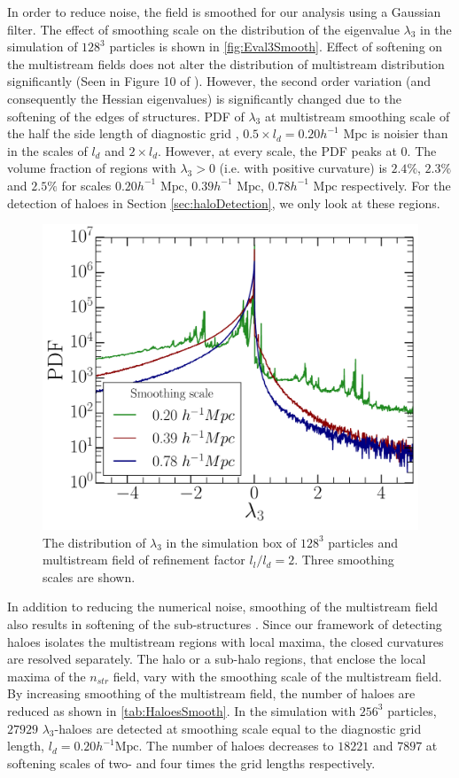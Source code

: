 \documentclass[fleqn,usenatbib,useAMS]{mnras}
\begin{document}
{In order to reduce noise, the field is smoothed for our analysis using a Gaussian filter. The effect of smoothing scale on the distribution of the eigenvalue $\lambda_3$ in the simulation of $128^3$ particles is shown in \autoref{fig:Eval3Smooth}. Effect of softening on the multistream fields does not alter the distribution of multistream distribution significantly (Seen in Figure 10 of \citealt{Ramachandra2017}).
However, the second order variation (and consequently the Hessian eigenvalues) is significantly changed due to the softening of the edges of structures. PDF of $\lambda_3$ at multistream smoothing scale of the half the side length of diagnostic grid , $0.5 \times l_d = 0.20 h^{-1} \text{ Mpc}$ is noisier than in the scales of $l_d$ and $2 \times l_d$. However, at every scale, the PDF peaks at $0$. The volume fraction of regions with $\lambda_3 > 0$ (i.e. with positive curvature) is $2.4\%$, $2.3\%$ and $2.5\%$ for scales $0.20 h^{-1} \text{ Mpc}$, $0.39 h^{-1} \text{ Mpc}$, $0.78 h^{-1} \text{ Mpc}$ respectively. For the detection of haloes in Section \ref{sec:haloDetection}, we only look at these regions.

 


\begin{figure}
\begin{minipage}[t]{.99\linewidth}
 \centering\includegraphics[width=8.cm]{fig5.pdf} 
\end{minipage}\hfill
\caption{The distribution of $\lambda_3$ in the simulation box of $128^3$ particles and multistream field of refinement factor $l_l/l_d = 2$. Three smoothing scales are shown. }
\label{fig:Eval3Smooth}
\end{figure}

In addition to reducing the numerical noise, smoothing of the multistream field also results in softening of the sub-structures \cite{Ramachandra2017}. Since our framework of detecting haloes isolates the multistream regions with local maxima, the closed curvatures are resolved separately. The halo or a sub-halo regions, that enclose the local maxima of the $n_{str}$ field, vary with the smoothing scale of the multistream field. By increasing smoothing of the multistream field, the number of haloes are reduced as shown in \autoref{tab:HaloesSmooth}. In the simulation with $256^3$ particles, $27929$ $\lambda_3$-haloes are detected at smoothing scale equal to the diagnostic grid length, $l_d = 0.20 h^{-1} \text{Mpc}$. The number of haloes decreases to $18221$ and $7897$ at softening scales of two- and four times the grid lengths respectively. 

}
\end{document}
